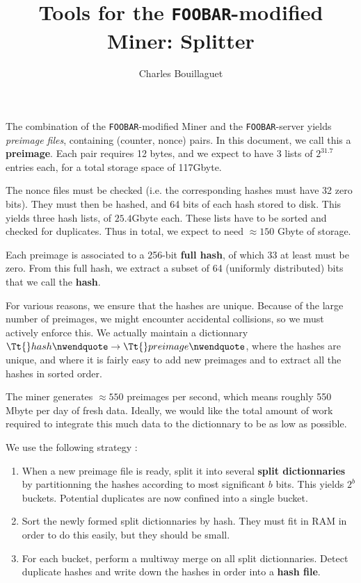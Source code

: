\documentclass{article}%
\begin{document}
\title{Tools for the \texttt{FOOBAR}-modified Miner: Splitter}
\author{Charles Bouillaguet}

\maketitle

The combination of the \texttt{FOOBAR}-modified Miner and the
\texttt{FOOBAR}-server yields \emph{preimage files}, containing (counter,
nonce) pairs. In this document, we call this a \textbf{preimage}. Each pair
requires 12 bytes, and we expect to have 3 lists of $2^{31.7}$ entries each,
for a total storage space of 117Gbyte.

The nonce files must be checked (i.e. the corresponding hashes must have 32
zero bits). They must then be hashed, and 64 bits of each hash stored to disk.
This yields three hash lists, of $25.4$Gbyte each. These lists have to be
sorted and checked for duplicates. Thus in total, we expect to need $\approx
150$ Gbyte of storage.

Each preimage is associated to a 256-bit \textbf{full hash}, of which 33 at
least must be zero. From this full hash, we extract a subset of 64 (uniformly
distributed) bits that we call the \textbf{hash}.

For various reasons, we ensure that the hashes are unique. Because of the
large number of preimages, we might encounter accidental collisions, so we
must actively enforce this. We actually maintain a dictionnary ${\Tt{}hash\nwendquote}
\rightarrow {\Tt{}preimage\nwendquote}$, where the hashes are unique, and where it is fairly
easy to add new preimages and to extract all the hashes in sorted order.

The miner generates $\approx 550$ preimages per second, which means roughly
550 Mbyte per day of fresh data. Ideally, we would like the total amount of
work required to integrate this much data to the dictionnary to be as low as
possible.

We use the following strategy :

\begin{enumerate}  
\item When a new preimage file is ready, split it into several \textbf{split dictionnaries}
by partitionning the hashes according to most significant $b$ bits. This yields 
$2^b$ buckets. Potential duplicates are now confined into a single bucket.

\item Sort the newly formed split dictionnaries by hash. They must fit in RAM in 
order to do this easily, but they should be small.

\item For each bucket, perform a multiway merge on all split dictionnaries. 
Detect duplicate hashes and write down the hashes in order into a \textbf{hash file}.
\end{enumerate}
\end{document}
